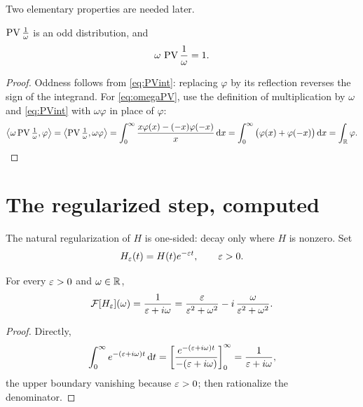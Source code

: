 Two elementary properties are needed later.

\begin{proposition}\label{prop:PVprops}
$\operatorname{PV}\frac{1}{\omega}$ is an odd distribution, and
\begin{equation}
\omega\,\operatorname{PV}\frac{1}{\omega}=1 .
\label{eq:omegaPV}
\end{equation}
\end{proposition}

\begin{proof}
Oddness follows from \eqref{eq:PVint}: replacing $\varphi$ by its reflection reverses the sign of the
integrand. For \eqref{eq:omegaPV}, use the definition of multiplication by $\omega$ and
\eqref{eq:PVint} with $\omega\varphi$ in place of $\varphi$:
\begin{equation}
\left\langle\omega\operatorname{PV}\tfrac{1}{\omega},\varphi\right\rangle
=\left\langle\operatorname{PV}\tfrac{1}{\omega},\omega\varphi\right\rangle
=\int_{0}^{\infty}\frac{x\varphi(x)-(-x)\varphi(-x)}{x}\,\mathrm{d} x
=\int_{0}^{\infty}\big(\varphi(x)+\varphi(-x)\big)\,\mathrm{d} x=\int_{\mathbb{R}}\varphi . \qedhere
\end{equation}
\end{proof}

\section{The regularized step, computed}

The natural regularization of $H$ is one-sided: decay only where $H$ is nonzero. Set
\begin{equation}
H_{\varepsilon}(t)=H(t)e^{-\varepsilon t},\qquad \varepsilon>0 .
\label{eq:Heps}
\end{equation}

\begin{theorem}\label{thm:Heps}
For every $\varepsilon>0$ and $\omega\in\mathbb{R}$,
\begin{equation}
\mathcal{F}[H_{\varepsilon}](\omega)=\frac{1}{\varepsilon+i\omega}
=\frac{\varepsilon}{\varepsilon^{2}+\omega^{2}}-i\,\frac{\omega}{\varepsilon^{2}+\omega^{2}} .
\label{eq:Hepssplit}
\end{equation}
\end{theorem}

\begin{proof}
Directly,
\begin{equation}
\int_{0}^{\infty}e^{-(\varepsilon+i\omega)t}\,\mathrm{d} t
=\left[\frac{e^{-(\varepsilon+i\omega)t}}{-(\varepsilon+i\omega)}\right]_{0}^{\infty}
=\frac{1}{\varepsilon+i\omega},
\end{equation}
the upper boundary vanishing because $\varepsilon>0$; then rationalize the denominator.
\end{proof}

